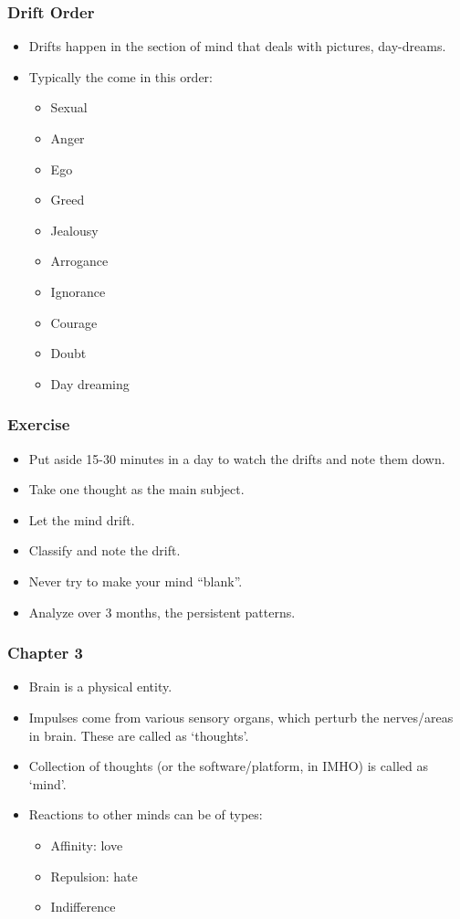 \begin{frame}[fragile]
\frametitle{Drift Order}
\begin{itemize}
\item Drifts happen in the section of mind that deals with pictures, day-dreams.
\item Typically the come in this order:
\begin{itemize}
\item Sexual
\item Anger
\item Ego
\item Greed
\item Jealousy
\item Arrogance
\item Ignorance
\item Courage
\item Doubt
\item Day dreaming
\end{itemize}
\end{itemize}
\end{frame}

\begin{frame}[fragile]
\frametitle{Exercise}
\begin{itemize}
\item Put aside 15-30 minutes in a day to watch the drifts and note them down.
\item Take one thought as the main subject.
\item Let the mind drift.
\item Classify and note the drift.
\item Never try to make your mind ``blank''.
\item Analyze over 3 months, the persistent patterns.
\end{itemize}
\end{frame}

\begin{frame}[fragile]
\frametitle{Chapter 3}
\begin{itemize}
\item Brain is a physical entity.
\item Impulses come from various sensory organs, which perturb the nerves/areas in brain. These are called as `thoughts'.
\item Collection of thoughts (or the software/platform, in IMHO) is called as `mind'.
\item Reactions to other minds can be of types:
\begin{itemize}
\item Affinity: love
\item Repulsion: hate
\item Indifference
\end{itemize}
\end{itemize}


\end{frame}


